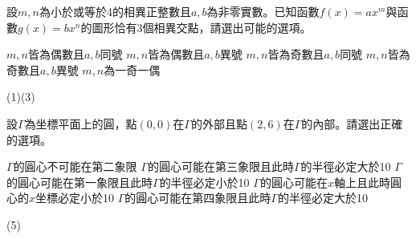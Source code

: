 \begin{QUESTIONS}
	\setcounter{enumi}{8}
\begin{QUESTION}
    \begin{QBODY}	設$m,n$為小於或等於4的相異正整數且$a,b$為非零實數。已知函數$f(x)=a{{x}^{m}}$與函數$g(x)=b{{x}^{n}}$的圖形恰有3個相異交點，請選出可能的選項。
        \begin{QOPS}
        \QOP $m,n$皆為偶數且$a,b$同號 
        \QOP $m,n$皆為偶數且$a,b$異號
        \QOP $m,n$皆為奇數且$a,b$同號
        \QOP $m,n$皆為奇數且$a,b$異號
        \QOP $m,n$為一奇一偶
        \end{QOPS}
    \end{QBODY}
    \begin{QFROMS}
    \end{QFROMS}
    \begin{QTAGS}
    \end{QTAGS}
    \begin{QANS}
        (1)(3)
    \end{QANS}
    \begin{QSOL}
    \end{QSOL}
    \begin{QEMPTYSPACE}
    \end{QEMPTYSPACE}
\end{QUESTION}
\begin{QUESTION}
    \begin{QBODY}
        設$\Gamma $為坐標平面上的圓，點$(0,0)$在$\Gamma $的外部且點$(2,6)$在$\Gamma $的內部。請選出正確的選項。
        \begin{QOPS}
        \QOP $\Gamma $的圓心不可能在第二象限
        \QOP $\Gamma $的圓心可能在第三象限且此時$\Gamma $的半徑必定大於10
        \QOP $\Gamma $的圓心可能在第一象限且此時$\Gamma $的半徑必定小於10
        \QOP $\Gamma $的圓心可能在$x$軸上且此時圓心的$x$坐標必定小於10
        \QOP $\Gamma $的圓心可能在第四象限且此時$\Gamma $的半徑必定大於10
        \end{QOPS}
    \end{QBODY}
    \begin{QFROMS}
    \end{QFROMS}
    \begin{QTAGS}
    \end{QTAGS}
    \begin{QANS}
        (5)
    \end{QANS}
    \begin{QSOL}
    \end{QSOL}

\end{QUESTION}
\end{QUESTIONS}
